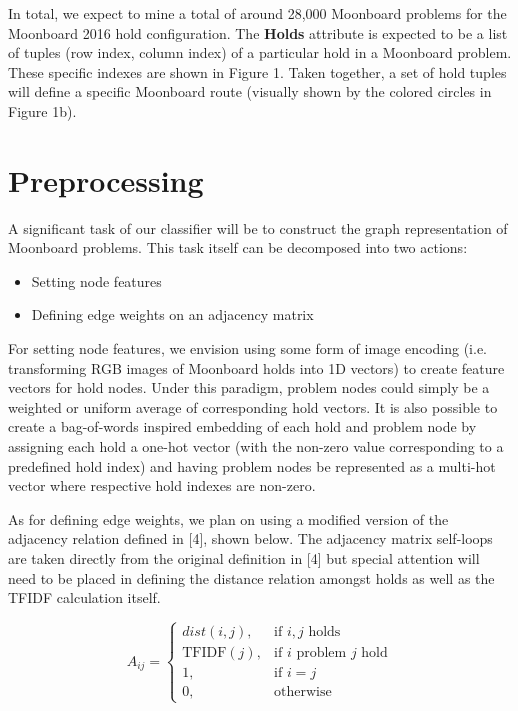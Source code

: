 \documentclass{article}
\begin{document}
In total, we expect to mine a total of around 28,000 Moonboard problems for the Moonboard 2016 hold configuration. The \textbf{Holds} attribute is expected to be a list of tuples (row index, column index) of a particular hold in a Moonboard problem. These specific indexes are shown in Figure 1. Taken together, a set of hold tuples will define a specific Moonboard route (visually shown by the colored circles in Figure 1b).

\section{Preprocessing}
A significant task of our classifier will be to construct the graph representation of Moonboard problems. This task itself can be decomposed into two actions: 

\begin{itemize}
\setlength\itemsep{0.1em}
\item Setting node features
\item Defining edge weights on an adjacency matrix
\end{itemize}

For setting node features, we envision using some form of image encoding (i.e. transforming RGB images of Moonboard holds into 1D vectors) to create feature vectors for hold nodes. Under this paradigm, problem nodes could simply be a weighted or uniform average of corresponding hold vectors. It is also possible to create a bag-of-words inspired embedding of each hold and problem node by assigning each hold a one-hot vector (with the non-zero value corresponding to a predefined hold index) and having problem nodes be represented as a multi-hot vector where respective hold indexes are non-zero. 

As for defining edge weights, we plan on using a modified version of the adjacency relation defined in [4], shown below. The adjacency matrix self-loops are taken directly from the original definition in [4] but special attention will need to be placed in defining the distance relation amongst holds as well as the TFIDF calculation itself.

\[
    A_{ij}= 
\begin{cases}
    dist(i, j), & \text{if } i, j \text{ holds} \\
    \text{TFIDF}(j), & \text{if } i \text{ problem } j \text{ hold} \\
    1, & \text{if } i=j \\
    0, & \text{otherwise}
\end{cases}
\]
\end{document}
